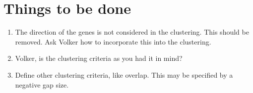 \documentclass[12pt]{article}
\begin{document}
\section{Things to be done}
\begin{enumerate}
\item
The direction of the genes is not considered in the clustering. This should be
removed. Ask Volker how to incorporate this into the clustering.
\item
Volker, is the clustering criteria as you had it in mind?
\item
Define other clustering criteria, like overlap. This may be specified by
a negative gap size.
\end{enumerate}
\end{document}
